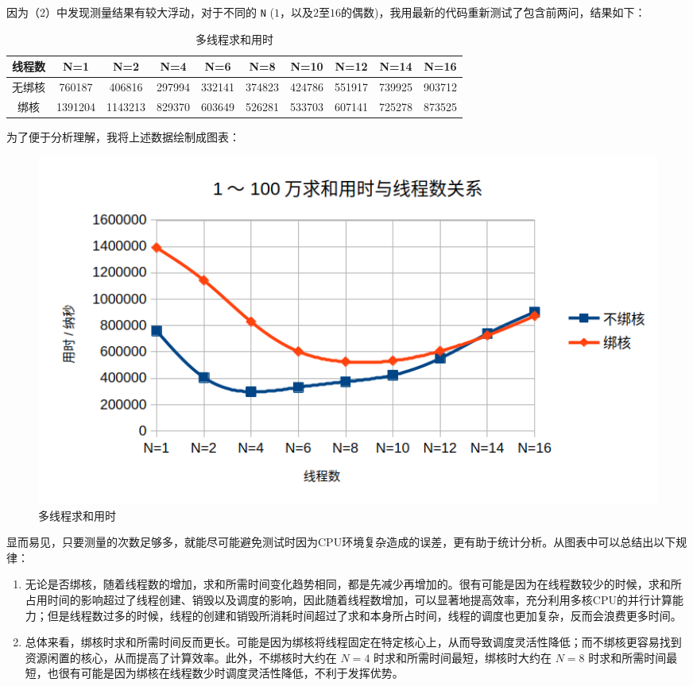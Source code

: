 因为（2）中发现测量结果有较大浮动，对于不同的 {\tt N} ($1$，以及$2$至$16$的偶数)，我用最新的代码重新测试了包含前两问，结果如下：

\begin{table}[H]
    \caption{多线程求和用时}
    \begin{tabular}{|c|c|c|c|c|c|c|c|c|c|}
    \hline
    线程数 & N=1 & N=2 & N=4 & N=6 & N=8 & N=10 & N=12 & N=14 & N=16 \\ \hline
    无绑核 & 760187 & 406816 & 297994 & 332141 & 374823 & 424786 & 551917 & 739925 & 903712 \\ \hline
    绑核 & 1391204 & 1143213 & 829370 & 603649 & 526281 & 533703 & 607141 & 725278 & 873525 \\ \hline
    \end{tabular}
\end{table}

为了便于分析理解，我将上述数据绘制成图表：

\begin{figure}[H]
    \centering
    \includegraphics[width=1\textwidth]{fig/chart.png}
    \caption{多线程求和用时}
\end{figure}

显而易见，只要测量的次数足够多，就能尽可能避免测试时因为CPU环境复杂造成的误差，更有助于统计分析。从图表中可以总结出以下规律：

\begin{enumerate}
    \item 无论是否绑核，随着线程数的增加，求和所需时间变化趋势相同，都是先减少再增加的。很有可能是因为在线程数较少的时候，求和所占用时间的影响超过了线程创建、销毁以及调度的影响，因此随着线程数增加，可以显著地提高效率，充分利用多核CPU的并行计算能力；但是线程数过多的时候，线程的创建和销毁所消耗时间超过了求和本身所占时间，线程的调度也更加复杂，反而会浪费更多时间。
    \item 总体来看，绑核时求和所需时间反而更长。可能是因为绑核将线程固定在特定核心上，从而导致调度灵活性降低；而不绑核更容易找到资源闲置的核心，从而提高了计算效率。此外，不绑核时大约在 $N=4$ 时求和所需时间最短，绑核时大约在 $N=8$ 时求和所需时间最短，也很有可能是因为绑核在线程数少时调度灵活性降低，不利于发挥优势。
\end{enumerate}


